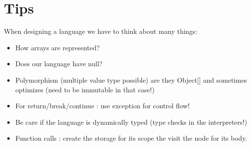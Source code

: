 \section{Tips}
When designing a language we have to think about many things:
\begin{itemize}
    \item How arrays are represented?
    \item Does our language have null?
    \item Polymorphism (multiple value type possible) are they Object[] and
    sometimes optimizes (need to be immutable in that case!)
    \item For return/break/continue : use exception for control flow!
    \item Be care if the language is dynamically typed (type checks in the
    interpreters!)
    \item Function calls : create the storage for its scope the visit the node for its body.
\end{itemize}